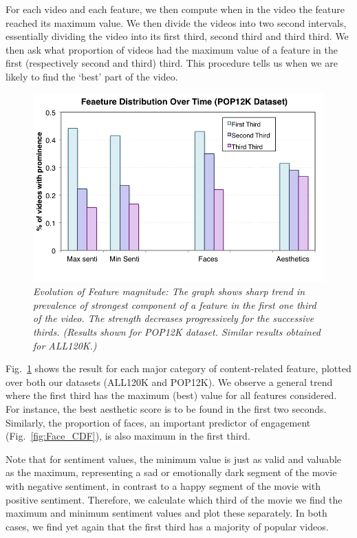 For each video and each feature, we then compute when in the video the feature reached its maximum value. We then divide the videos into two second intervals, essentially dividing the video into its first third, second third and third third. We then ask what proportion of videos had the maximum value of a feature in the first (respectively second and third) third. This procedure tells us when we are likely to find the `best' part of the video. 

\begin{figure}[!htb]
\centering
\includegraphics[width=\columnwidth]{plots/ThirdsDistribution.png}
\caption{\textsl{Evolution of Feature magnitude: The graph shows sharp trend in prevalence of strongest component of a feature in the first one third of the video. The strength decreases progressively for the successive thirds. (Results shown for POP12K dataset. Similar results obtained for ALL120K.)}}
\label{fig:Face_Thirds}
\end{figure}

Fig.~\ref{fig:Face_Thirds} shows the result for each major category of content-related feature, plotted over both our datasets (ALL120K and POP12K). We observe a general trend where the first third has the maximum (best) value for all features considered. For instance, the best aesthetic score is to be found in the first two seconds. Similarly, the proportion of faces, an important predictor of engagement (Fig.~\ref{fig:Face_CDF}), is also maximum in the first third. 

Note that for sentiment values, the minimum value is just as valid and valuable as the maximum, representing a sad or emotionally dark segment of the movie with negative sentiment, in contrast to a happy segment of the movie with positive sentiment. Therefore, we calculate which third of the movie we find the maximum and minimum sentiment values and plot these separately. In both cases, we find  yet again that the first third has a majority of popular videos. 

